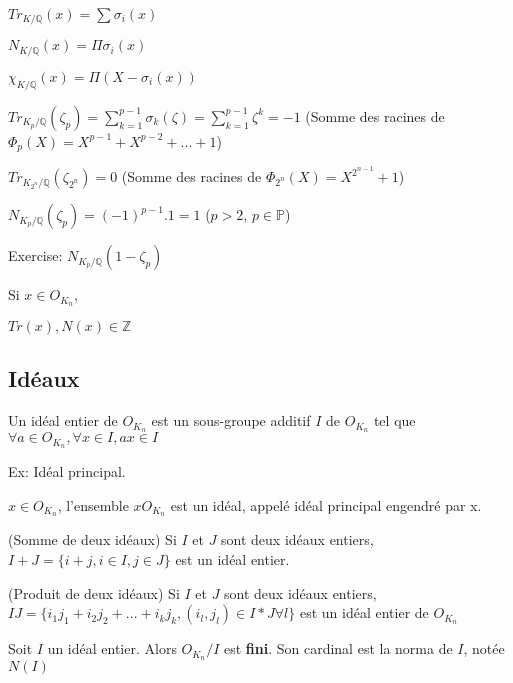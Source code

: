 \begin{theorem}
$Tr_{K/\mathbb{Q}}(x)=\sum \sigma_i(x)$

$N_{K/\mathbb{Q}}(x)=\Pi \sigma_i(x)$

$\chi_{K/\mathbb{Q}}(x)=\Pi(X-\sigma_i(x))$
\end{theorem}

\begin{corollary}
$Tr_{K_p/\mathbb{Q}}(\zeta_p)=\sum_{k=1}^{p-1} \sigma_k(\zeta)=\sum_{k=1}^{p-1} \zeta^k=-1$ (Somme des racines de $\Phi_p(X)=X^{p-1}+X^{p-2}+...+1$)

$Tr_{K_{2^n}/\mathbb{Q}}(\zeta_{2^n})=0$ (Somme des racines de $\Phi_{2^n}(X)=X^{2^{n-1}}+1$)

$N_{K_p/\mathbb{Q}}(\zeta_p)=(-1)^{p-1}.1=1$ ($p >2$, $p \in \mathbb{P}$)
\end{corollary}

Exercise: $N_{K_p/\mathbb{Q}}(1-\zeta_p)$

\begin{proposition}
Si $x \in O_{K_n}$,

$Tr(x), N(x) \in \mathbb{Z}$
\end{proposition}

\subsection{Idéaux}

\begin{definition}
Un idéal entier de $O_{K_n}$ est un sous-groupe additif $I$ de $O_{K_n}$ tel que $\forall a \in O_{K_n}, \forall x \in I, a x \in I$
\end{definition}

Ex: Idéal principal.

$x \in O_{K_n}$, l'ensemble $x O_{K_n}$ est un idéal, appelé idéal principal engendré par x.

\begin{definition} (Somme de deux idéaux)
Si $I$ et $J$ sont deux idéaux entiers, $I+J=\{i+j, i \in I, j \in J\}$ est un idéal entier.
\end{definition}

\begin{definition} (Produit de deux idéaux)
Si $I$ et $J$ sont deux idéaux entiers,
$I J= \{ i_1 j_1+ i_2 j_2+...+ i_k j_k, (i_l,j_l) \in I*J \forall l \}$ est un idéal entier de $O_{K_n}$
\end{definition}

\begin{proposition}
Soit $I$ un idéal entier. Alors $O_{K_n}/I$ est \textbf{fini}. Son cardinal est la norma de $I$, notée $N(I)$
\end{proposition}

